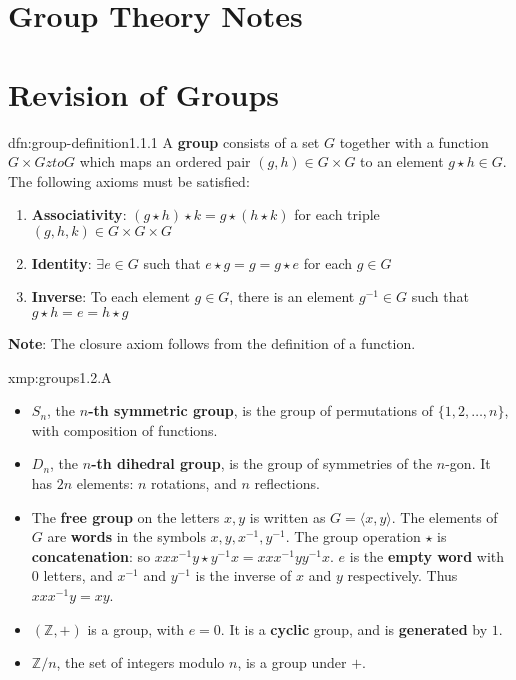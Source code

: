 \documentclass[landscape, 8pt]{extarticle}
\begin{document}
\setlength{\abovedisplayskip}{3.5pt}
\setlength{\belowdisplayskip}{3.5pt}
\setlength{\abovedisplayshortskip}{3.5pt}
\setlength{\belowdisplayshortskip}{3.5pt}
\setlength{\multicolsep}{0pt}%

\begin{multicols*}{3}
\raggedcolumns
\section*{\huge Group Theory Notes}

\section{Revision of Groups}
\begin{dfn}{dfn:group-definition}{1.1.1}
	A \textbf{group} consists of a set $G$ together with a function $G \times G zto G$ which maps an ordered pair $(g, h) \in G \times G$ to an element $g \star h \in G$. The following axioms must be satisfied:
	\begin{enumerate}
	    \item \textbf{Associativity}: $(g \star h) \star k = g \star (h \star k)$ for each triple $(g,h,k)\in G \times G \times G$
	    \item \textbf{Identity}: $\exists e\in G$ such that $e\star g = g = g \star e$ for each $g\in G$
	    \item \textbf{Inverse}: To each element $g\in G$, there is an element $g^{-1} \in G$ such that $g\star h = e = h \star g$
	\end{enumerate}
	\textbf{Note}: The closure axiom follows from the definition of a function.
\end{dfn}

\begin{xmp}{xmp:groups}{1.2.A}
	\begin{itemize}
	    \item[\textbf{1.2.1})] $S_{n}$, the \textbf{$n$-th symmetric group}, is the group of permutations of $\{1,2,\dots,n\}$, with composition of functions.
	    \item[\textbf{1.2.2})] $D_{n}$, the \textbf{$n$-th dihedral group}, is the group of symmetries of the $n$-gon. It has $2n$ elements: $n$ rotations, and $n$ reflections.
	    \item[\textbf{1.2.3})] The \textbf{free group} on the letters $x, y$ is written as $G = \langle x, y \rangle$. The elements of $G$ are \textbf{words} in the symbols $x, y, x^{-1}, y^{-1}$. The group operation $\star$ is \textbf{concatenation}: so $x x x^{-1}y \star y^{-1} x = x x x^{-1} y y^{-1} x$. $e$ is the \textbf{empty word} with $0$ letters, and $x^{-1}$ and $y^{-1}$ is the inverse of $x$ and $y$ respectively. Thus $x x x^{-1} y = xy$.
	    \item[\textbf{1.2.4})] $(\mathbb{Z}, +)$ is a group, with $e = 0$. It is a \textbf{cyclic} group, and is \textbf{generated} by $1$.
	    \item[\textbf{1.2.5})] $\mathbb{Z} /n$, the set of integers modulo $n$, is a group under $+$.
	\end{itemize}
\end{xmp}


\end{multicols*}
\end{document}
